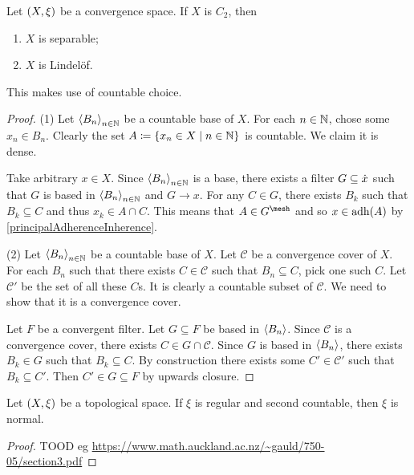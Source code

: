 \begin{proposition} \label{C2properties}
Let $\sSet{X,\xi}$ be a convergence space. If $X$ is $C_2$, then
\begin{enumerate}
\item $X$ is separable;
\item $X$ is Lindelöf.
\end{enumerate}
\end{proposition}
This makes use of countable choice.
\begin{proof}
(1) Let $\left\langle B_n \right\rangle_{n\in \mathbb{N}}$ be a countable base of $X$. For each $n\in \mathbb{N}$, chose some $x_n\in B_n$. Clearly the set $A \defeq \setbuilder{x_n\in X}{n\in \N}$ is countable. We claim it is dense.

Take arbitrary $x\in X$. Since $\left\langle B_n \right\rangle_{n\in \mathbb{N}}$ is a base, there exists a filter $G \subseteq \dot{x}$ such that $G$ is based in $\left\langle B_n \right\rangle_{n\in \mathbb{N}}$ and $G\to x$. For any $C\in G$, there exists $B_k$ such that $B_k \subseteq C$ and thus $x_k \in A \cap C$.
This means that $A\in G^\mesh$ and so $x\in \operatorname{adh}(A)$ by \ref{principalAdherenceInherence}.

(2) Let $\left\langle B_n \right\rangle_{n\in \mathbb{N}}$ be a countable base of $X$. Let $\mathcal{C}$ be a convergence cover of $X$. For each $B_n$ such that there exists $C\in \mathcal{C}$ such that $B_n \subseteq C$, pick one such $C$. Let $\mathcal{C}'$ be the set of all these $C$s. It is clearly a countable subset of $\mathcal{C}$. We need to show that it is a convergence cover.

Let $F$ be a convergent filter. Let $G\subseteq F$ be based in $\left\langle B_n \right\rangle$. Since $\mathcal{C}$ is a convergence cover, there exists $C\in G\cap \mathcal{C}$. Since $G$ is based in $\left\langle B_n \right\rangle$, there exists $B_k\in G$ such that $B_k \subseteq C$. By construction there exists some $C'\in \mathcal{C}'$ such that $B_k \subseteq C'$. Then $C'\in G \subseteq F$ by upwards closure.
\end{proof}

\begin{proposition} \label{countableRegularityImpliesNormality}
Let $\sSet{X,\xi}$ be a topological space. If $\xi$ is regular and second countable, then $\xi$ is normal.
\end{proposition}
\begin{proof}
TOOD eg \url{https://www.math.auckland.ac.nz/~gauld/750-05/section3.pdf}
\end{proof}






